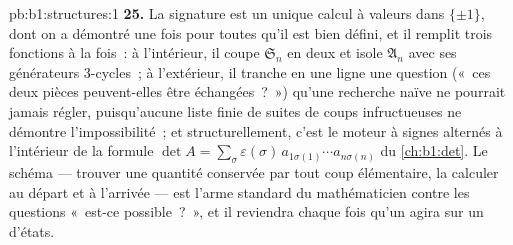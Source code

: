 \begin{solution}{pb:b1:structures:1}
\textbf{25.} La signature est un unique calcul à valeurs dans
$\{\pm1\}$, dont on a démontré une fois pour toutes qu'il est bien
défini, et il remplit trois fonctions à la fois~: à l'intérieur, il coupe
$\mathfrak S_n$ en deux et isole $\mathfrak A_n$ avec ses générateurs
$3$-cycles~; à l'extérieur, il tranche en une ligne une question
(«~ces deux pièces peuvent-elles être échangées~?~») qu'une recherche
naïve ne pourrait jamais régler, puisqu'aucune liste finie de suites
de coups infructueuses ne démontre l'impossibilité~; et
structurellement, c'est le moteur à signes alternés à l'intérieur de la
formule $\det A = \sum_\sigma \varepsilon(\sigma)\,
a_{1\sigma(1)}\cdots a_{n\sigma(n)}$ du \cref{ch:b1:det}. Le schéma ---
trouver une quantité conservée par tout coup élémentaire, la calculer
au départ et à l'arrivée --- est l'arme standard du mathématicien contre
les questions «~est-ce possible~?~», et il reviendra chaque fois qu'un
 agira sur un  d'états.
\end{solution}
